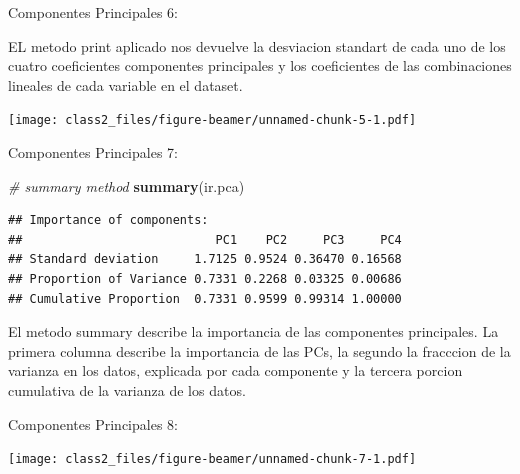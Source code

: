 \documentclass[ignorenonframetext,]{beamer}
\newenvironment{Shaded}{\begin{snugshade}}{\end{snugshade}}
\newcommand{\KeywordTok}[1]{\textcolor[rgb]{0.13,0.29,0.53}{\textbf{#1}}}
\newcommand{\DataTypeTok}[1]{\textcolor[rgb]{0.13,0.29,0.53}{#1}}
\newcommand{\DecValTok}[1]{\textcolor[rgb]{0.00,0.00,0.81}{#1}}
\newcommand{\CommentTok}[1]{\textcolor[rgb]{0.56,0.35,0.01}{\textit{#1}}}
\newcommand{\OperatorTok}[1]{\textcolor[rgb]{0.81,0.36,0.00}{\textbf{#1}}}
\newcommand{\NormalTok}[1]{#1}
\begin{document}
\begin{frame}

\begin{block}{Componentes Principales 6:}

EL metodo print aplicado nos devuelve la desviacion standart de cada uno
de los cuatro coeficientes componentes principales y los coeficientes de
las combinaciones lineales de cada variable en el dataset.

\texttt{[image: class2\_files/figure-beamer/unnamed-chunk-5-1.pdf]}

\end{block}

\end{frame}

\begin{frame}[fragile]

\begin{block}{Componentes Principales 7:}

\begin{Shaded}
\begin{Highlighting}[]
\CommentTok{# summary method}
\KeywordTok{summary}\NormalTok{(ir.pca)}
\end{Highlighting}
\end{Shaded}

\begin{verbatim}
## Importance of components:
##                           PC1    PC2     PC3     PC4
## Standard deviation     1.7125 0.9524 0.36470 0.16568
## Proportion of Variance 0.7331 0.2268 0.03325 0.00686
## Cumulative Proportion  0.7331 0.9599 0.99314 1.00000
\end{verbatim}

El metodo summary describe la importancia de las componentes
principales. La primera columna describe la importancia de las PCs, la
segundo la fracccion de la varianza en los datos, explicada por cada
componente y la tercera porcion cumulativa de la varianza de los datos.

\end{block}

\end{frame}

\begin{frame}[fragile]

\begin{block}{Componentes Principales 8:}

\begin{Shaded}
\end{Shaded}

\texttt{[image: class2\_files/figure-beamer/unnamed-chunk-7-1.pdf]}

\end{block}

\end{frame}
\end{document}
